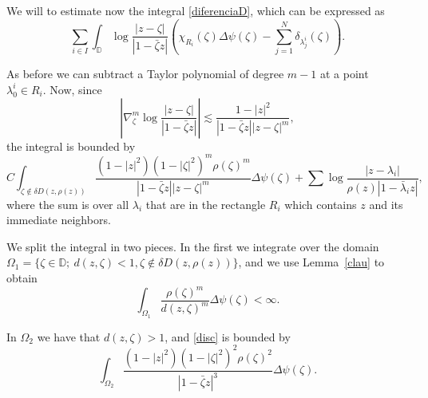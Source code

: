 \documentclass[12pt,twoside,final,psamsfonts]{amsart}
\theoremstyle{plain}
\theoremstyle{remark}
\theoremstyle{definition}
\newcommand{\D}{{\mathbb D}}
\begin{document}
We will to estimate now the integral \eqref{diferenciaD}, which can be
expressed as
\[
\sum_{i\in I}\int_{\D} \log \frac{|z-\zeta|}{|1-\bar\zeta z|} 
\left(\chi_{R_i}(\zeta)\Delta\psi(\zeta)-\sum_{j=1}^N
\delta_{\lambda_j^i}(\zeta)\right).
\]

As before we can subtract a Taylor polynomial of degree $m-1$ 
at a point $\lambda_0^i\in R_i$. Now, since 
\[
\left|\nabla_\zeta^m \log \frac{|z-\zeta|}{|1-\bar\zeta z|}\right|\lesssim
\frac{1-|z|^2}{|1-\bar\zeta z||z-\zeta|^m},
\]
the integral is bounded by
\begin{equation}\label{disc}
C\int_{\zeta\notin\delta D(z,\rho(z))} 
\frac{(1-|z|^2)(1-|\zeta|^2)^m\rho(\zeta)^m}
{|1-\bar\zeta z||z-\zeta|^m}\Delta\psi(\zeta)+\sum
\log\frac{|z-\lambda_i|}{\rho(z)|1-\bar\lambda_i z|},
\end{equation}
where the sum is over all $\lambda_i$ that are in the rectangle $R_i$ which 
contains $z$ and its immediate neighbors.  

We
split the integral in two pieces. In the first we integrate over the domain
$\Omega_1=\{\zeta\in \D;\ d(z,\zeta)<1, \zeta\notin\delta
D(z,\rho(z))\}$,  and we use Lemma~\ref{clau} to obtain
\[
\int_{\Omega_1}\frac{\rho(\zeta)^m}{d(z,\zeta)^m}\Delta\psi(\zeta)<\infty.
\]

In $\Omega_2$ we have that $d(z,\zeta)>1$, and \eqref{disc}
is bounded by
\[
\int_{\Omega_2}\frac{(1-|z|^2) (1-|\zeta|^2)^2\rho(\zeta)^2}{|1-\bar\zeta z|^3}
\Delta\psi(\zeta).
\]
\end{document}
